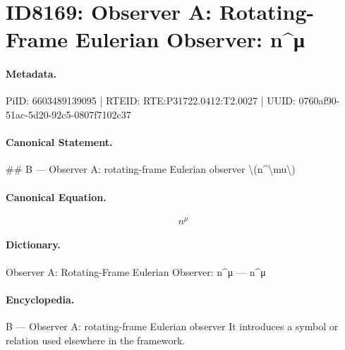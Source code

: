 \section*{ID8169: Observer A: Rotating-Frame Eulerian Observer: n\textasciicircum{}μ}
\paragraph{Metadata.}
PiID: 6603489139095 | RTEID: RTE:P31722.0412:T2.0027 | UUID: 0760af90-51ac-5d20-92c5-0807f7102c37

\paragraph{Canonical Statement.}
\#\# B — Observer A: rotating-frame Eulerian observer \textbackslash{}(n\textasciicircum{}\textbackslash{}mu\textbackslash{})

\paragraph{Canonical Equation.}
\[
n^\mu
\]

\paragraph{Dictionary.}
Observer A: Rotating-Frame Eulerian Observer: n\textasciicircum{}μ — n\textasciicircum{}μ

\paragraph{Encyclopedia.}
B — Observer A: rotating-frame Eulerian observer It introduces a symbol or relation used elsewhere in the framework.
